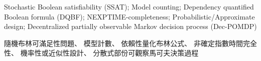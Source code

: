 




\newcommand{\myenglishkeywords}{
  Stochastic Boolean satisfiability (SSAT);
  Model counting;
  Dependency quantified Boolean formula (DQBF);
  NEXPTIME-completeness;
  Probabilistic/Approximate design;
  Decentralized partially observable Markov decision process (Dec-POMDP)
}

\newcommand{\mychinesekeywords}{
  隨機布林可滿足性問題、
  模型計數、
  依賴性量化布林公式、
  非確定指數時間完全性、
  機率性或近似性設計、
  分散式部份可觀察馬可夫決策過程
}

\frontmatter
\begin{abstracten}{\myenglishkeywords}
  
\end{abstracten}
\begin{abstractzh}{\mychinesekeywords}
  
\end{abstractzh}
\begin{acknowledgements}
  
\end{acknowledgements}


\tableofcontents
\mainmatter










\listoffigures
\listoftables
\cleardoublepage
{}
{}
\listofalgorithms



